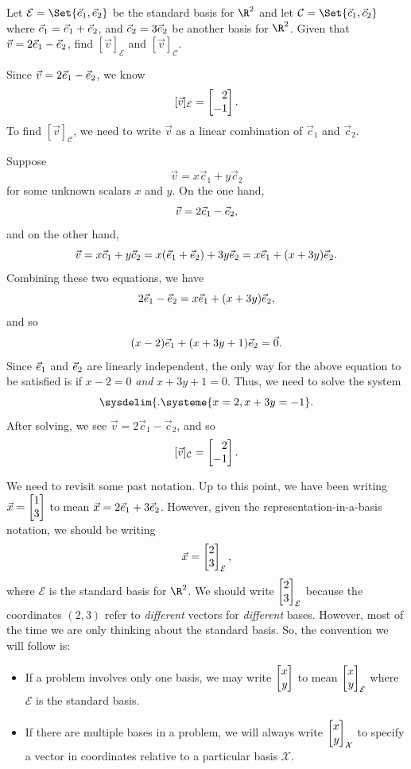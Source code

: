 
\begin{example}
	Let $\mathcal E=\Set{\xhat,\yhat}$ be the standard basis for $\R^2$ and let $\mathcal C=\Set{\vec c_1,\vec c_2}$
	where $\vec c_1={\vec e_1}+{\vec e_2}$, and $\vec c_2 =3{\vec e_2}$ be another basis for $\R^2$. Given that $\vec v=2{\vec e_1}-{\vec e_2}$, 
	find $[\vec v]_{\mathcal E}$ and $[\vec v]_{\mathcal C}$.

	Since $\vec v=2{\vec e_1}-{\vec e_2}$, we know
	\[
	    [\vec v]_{\mathcal E}=\mat{2\\-1}.
	\]
	To find $[\vec v]_{\mathcal C}$, we need to write $\vec v$ as a linear combination of $\vec c_1$ and $\vec c_2$. 
	
	Suppose
	\[
		\vec v = x\vec c_1 + y\vec c_2    
	\]
	for some unknown scalars $x$ and $y$. On the one hand,
	\[
	    \vec v = 2{\vec e_1}-{\vec e_2},
	\]
	and on the other hand, 
	\[
	    \vec v  = x\vec c_1 + y\vec c_2= x({\vec e_1}+{\vec e_2})+3y{\vec e_2}=x{\vec e_1}+(x+3y){\vec e_2}.
	\]
	Combining these two equations, we have
	\[
	    2{\vec e_1}-{\vec e_2} = x{\vec e_1}+(x+3y){\vec e_2},
	\]
	and so
	\[
		(x-2){\vec e_1}+(x+3y+1){\vec e_2} = \vec 0. 
	\]
	Since ${\vec e_1}$ and ${\vec e_2}$ are linearly independent, the only way for the above equation to be satisfied is if
	$x-2=0$ \emph{and} $x+3y+1=0$. Thus, we need to solve the system
	\[
	    \sysdelim\{.
		\systeme{
			x=2,
			x+3y=-1
		}.
	\]
	After solving, we see $\vec v=2\vec c_1 - \vec c_2$, and so
	\[
	   [\vec v]_{\mathcal C}=\mat{2\\-1}. 
	\]
\end{example}

We need to revisit some past notation. Up to this point, we have been writing $\vec x=\mat{1\\3}$ to mean
$\vec x=2{\vec e_1}+3{\vec e_2}$. However, given the representation-in-a-basis notation, we should be writing
\[
	\vec x=\mat{2\\3}_{\mathcal E},
\]
where $\mathcal E$ is the standard basis for $\R^2$. We should write $\mat{2\\3}_{\mathcal E}$ because the coordinates $(2,3)$
refer to \emph{different} vectors for \emph{different} bases. However, most of the time we are only thinking about the standard
basis. So, the convention we will follow is:
\begin{itemize}
	\item If a problem involves only one basis, we may write $\mat{x\\y}$ to mean $\mat{x\\y}_{\mathcal E}$ where
	$\mathcal E$ is the standard basis.
	\item If there are multiple bases in a problem, we will always write $\mat{x\\y}_{\mathcal X}$ to specify a vector in
	coordinates relative to a particular basis $\mathcal X$.
\end{itemize}

